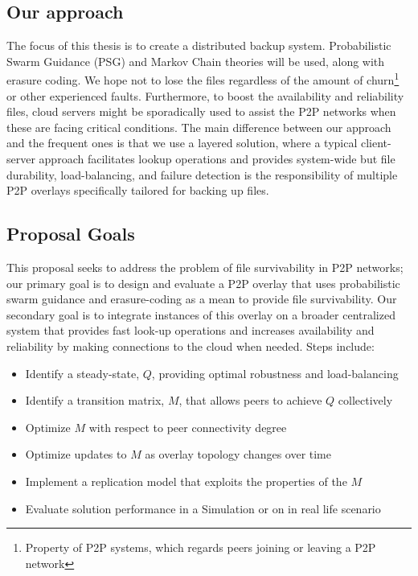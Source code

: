 \documentclass[runningheads]{llncs}
\begin{document}
\subsection{Our approach}
The focus of this thesis is to create a distributed backup system. Probabilistic Swarm Guidance (PSG) and Markov Chain theories will be used, along with erasure coding. We hope not to lose the files regardless of the amount of churn\footnote{Property of P2P systems, which regards peers joining or leaving a P2P network} or other experienced faults. Furthermore, to boost the availability and reliability files, cloud servers might be sporadically used to assist the P2P networks when these are facing critical conditions. The main difference between our approach and the frequent ones is that we use a layered solution, where a typical client-server approach facilitates lookup operations and provides system-wide but file durability, load-balancing, and failure detection is the responsibility of multiple P2P overlays specifically tailored for backing up files.

\subsection{Proposal Goals}\label{subsec:intro}
This proposal seeks to address the problem of file survivability in P2P networks; our primary goal is to design and evaluate a P2P overlay that uses probabilistic swarm guidance and erasure-coding as a mean to provide file survivability. Our secondary goal is to integrate instances of this overlay on a broader centralized system that provides fast look-up operations and increases availability and reliability by making connections to the cloud when needed. Steps include:

\begin{itemize}
    \item Identify a steady-state, $Q$, providing optimal robustness and load-balancing
    \item Identify a transition matrix, $M$, that allows peers to achieve $Q$ collectively
    \item Optimize $M$ with respect to peer connectivity degree
    \item Optimize updates to $M$ as overlay topology changes over time
    \item Implement a replication model that exploits the properties of the $M$
    \item Evaluate solution performance in a Simulation or on in real life scenario
\end{itemize}
\end{document}

